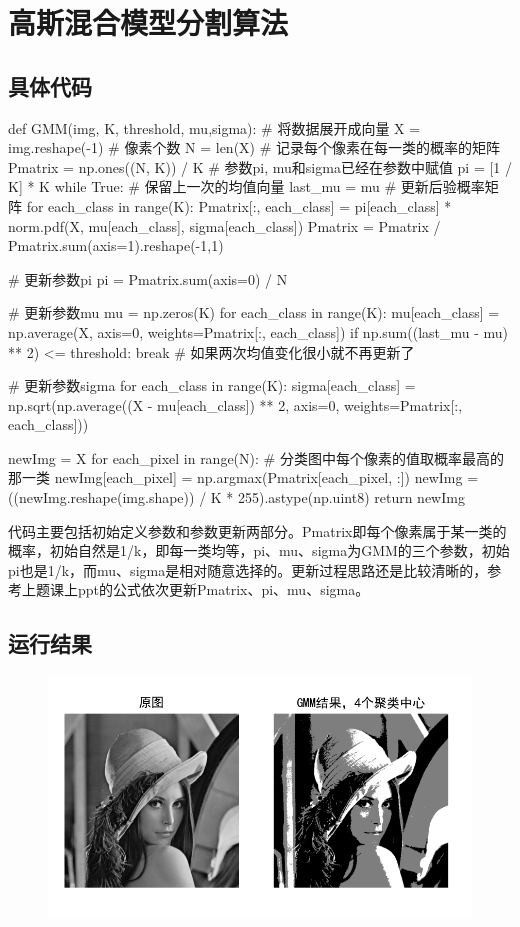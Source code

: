 \documentclass{article}
\begin{document}
\section{高斯混合模型分割算法}
\subsection{具体代码}
\begin{python}
	def GMM(img, K, threshold, mu,sigma):
		 # 将数据展开成向量
		 X = img.reshape(-1)
		 # 像素个数
		 N = len(X)
		 # 记录每个像素在每一类的概率的矩阵
		 Pmatrix = np.ones((N, K)) / K
		 # 参数pi, mu和sigma已经在参数中赋值
		 pi = [1 / K] * K
		 while True:
		 	 # 保留上一次的均值向量
		 	 last_mu = mu
		 	 # 更新后验概率矩阵
		 	 for each_class in range(K):
		 	 	 Pmatrix[:, each_class] = pi[each_class] * norm.pdf(X, mu[each_class], sigma[each_class])
		 	 	 Pmatrix = Pmatrix / Pmatrix.sum(axis=1).reshape(-1,1)
	
		 	 # 更新参数pi
		 	 pi = Pmatrix.sum(axis=0) / N
	
		 	 # 更新参数mu
		 	 mu = np.zeros(K)
		 	 for each_class in range(K):
		 	 	 mu[each_class] = np.average(X, axis=0, weights=Pmatrix[:, each_class])
		 	 if np.sum((last_mu - mu) ** 2) <= threshold:
		 	 	 break # 如果两次均值变化很小就不再更新了
	
		 	 # 更新参数sigma
		 	 for each_class in range(K):
		 	 	 sigma[each_class] = np.sqrt(np.average((X - mu[each_class]) ** 2, axis=0, weights=Pmatrix[:, each_class]))
	
		 newImg = X
		 for each_pixel in range(N):
		 	 # 分类图中每个像素的值取概率最高的那一类
		 	 newImg[each_pixel] = np.argmax(Pmatrix[each_pixel, :]) 
		 newImg = ((newImg.reshape(img.shape)) / K * 255).astype(np.uint8)
		 return newImg
\end{python}

代码主要包括初始定义参数和参数更新两部分。Pmatrix即每个像素属于某一类的概率，初始自然是1/k，即每一类均等，pi、mu、sigma为GMM的三个参数，初始pi也是1/k，而mu、sigma是相对随意选择的。更新过程思路还是比较清晰的，参考上题课上ppt的公式依次更新Pmatrix、pi、mu、sigma。

\subsection{运行结果}
\begin{figure}[H]  
	\centering
	\includegraphics[scale=1]{3.png}
\end{figure}
\end{document}
